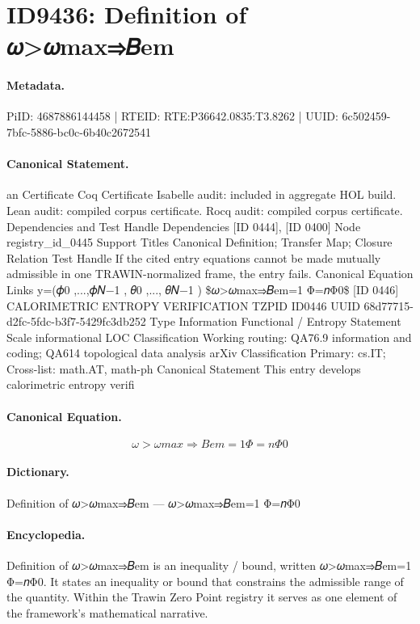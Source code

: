 \section*{ID9436: Definition of 𝜔>𝜔max⇒𝐵em}
\paragraph{Metadata.}
PiID: 4687886144458 | RTEID: RTE:P36642.0835:T3.8262 | UUID: 6c502459-7bfc-5886-bc0c-6b40c2672541

\paragraph{Canonical Statement.}
an Certificate Coq Certificate Isabelle audit: included in aggregate HOL build. Lean audit: compiled corpus certificate. Rocq audit: compiled corpus certificate. Dependencies and Test Handle Dependencies [ID 0444], [ID 0400] Node registry\_id\_0445 Support Titles Canonical Definition; Transfer Map; Closure Relation Test Handle If the cited entry equations cannot be made mutually admissible in one TRAWIN-normalized frame, the entry fails. Canonical Equation Links y=(𝜙0 ,...,𝜙𝑁−1 , 𝜃0 ,..., 𝜃𝑁−1 ) \$𝜔>𝜔max⇒𝐵em=1 Φ=𝑛Φ0\$ [ID 0446] CALORIMETRIC ENTROPY VERIFICATION TZPID ID0446 UUID 68d77715-d2fc-5fdc-b3f7-5429fc3db252 Type Information Functional / Entropy Statement Scale informational LOC Classification Working routing: QA76.9 information and coding; QA614 topological data analysis arXiv Classification Primary: cs.IT; Cross-list: math.AT, math-ph Canonical Statement This entry develops calorimetric entropy verifi

\paragraph{Canonical Equation.}
\[
𝜔>𝜔max⇒𝐵em=1 Φ=𝑛Φ0
\]

\paragraph{Dictionary.}
Definition of 𝜔>𝜔max⇒𝐵em — 𝜔>𝜔max⇒𝐵em=1 Φ=𝑛Φ0

\paragraph{Encyclopedia.}
Definition of 𝜔>𝜔max⇒𝐵em is an inequality / bound, written 𝜔>𝜔max⇒𝐵em=1 Φ=𝑛Φ0. It states an inequality or bound that constrains the admissible range of the quantity. Within the Trawin Zero Point registry it serves as one element of the framework's mathematical narrative.
